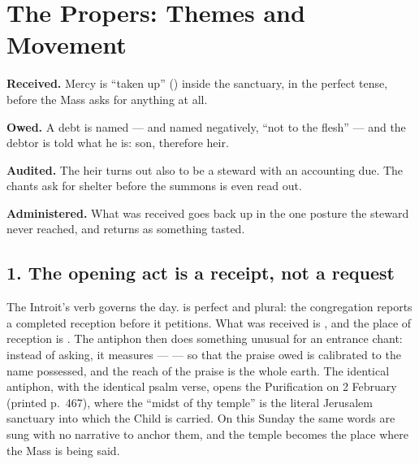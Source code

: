 \section{The Propers: Themes and Movement}


\begin{movementlist}
\item \textbf{Received.}  Mercy is ``taken up''
() inside the sanctuary, in the perfect tense, before the
Mass asks for anything at all.
\item \textbf{Owed.}  A debt is named --- and named
negatively, ``not to the flesh'' --- and the debtor is told what he is: son,
therefore heir.
\item \textbf{Audited.}  The heir turns out
also to be a steward with an accounting due. The chants ask for shelter before
the summons is even read out.
\item \textbf{Administered.}  What was
received goes back up in the one posture the steward never reached, and
returns as something tasted.
\end{movementlist}

\subsection*{1. The opening act is a receipt, not a request
}

The Introit's verb governs the day.  is perfect and plural:
the congregation reports a completed reception before it petitions. What was
received is , and the place of reception is
. The antiphon then does something unusual for an
entrance chant: instead of asking, it measures ---  --- so that the praise owed is
calibrated to the name possessed, and the reach of the praise is the whole
earth. The identical antiphon, with the identical psalm verse, opens the
Purification on 2 February (printed p.\ 467), where the ``midst of thy
temple'' is the literal Jerusalem sanctuary into which the Child is carried.
On this Sunday the same words are sung with no narrative to anchor them, and
the temple becomes the place where the Mass is being said.

